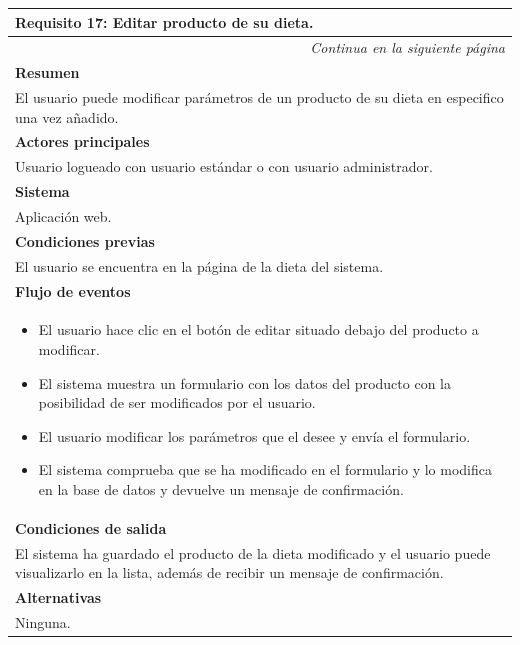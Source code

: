 \begin{longtable}{|p{}|}
\hline
 \rowcolor[gray]{.5}
 \color{white}\textbf{Requisito 17: Editar producto de su dieta.} \\
\hline
\endfirsthead
\endhead
\hline \multicolumn{1}{r}{\textit{Continua en la siguiente página}} \\
\endfoot
\endlastfoot
    \rowcolor[gray]{.9}
     \textbf{Resumen} \\
     \hline
     El usuario puede modificar parámetros de un producto de su dieta en especifico una vez añadido. \\
     \hline
     \rowcolor[gray]{.9}
     \textbf{Actores principales} \\
     \hline
     Usuario logueado con usuario estándar o con usuario administrador. \\
     \hline
     \rowcolor[gray]{.9}
     \textbf{Sistema} \\
     \hline
     Aplicación web. \\
     \hline
     \rowcolor[gray]{.9}
     \textbf{Condiciones previas} \\
     \hline
     El usuario se encuentra en la página de la dieta del sistema. \\
     \hline
     \rowcolor[gray]{.9}
     \textbf{Flujo de eventos}  \\
     \hline
      \begin{itemize}
         \item El usuario hace clic en el botón de editar situado debajo del producto a modificar.
         \item El sistema muestra un formulario con los datos del producto con la posibilidad de ser modificados por el usuario.
         \item El usuario modificar los parámetros que el desee y envía el formulario.
         \item El sistema comprueba que se ha modificado en el formulario y lo modifica en la base de datos y devuelve un mensaje de confirmación.
     \end{itemize} \\
     \hline
     \rowcolor[gray]{.9}
     \textbf{Condiciones de salida} \\
     \hline
     El sistema ha guardado el producto de la dieta modificado y el usuario puede visualizarlo en la lista, además de recibir un mensaje de confirmación. \\
     \hline
     \rowcolor[gray]{.9}
     \textbf{Alternativas}  \\
     \hline
      Ninguna. \\
     \hline
\end{longtable}

